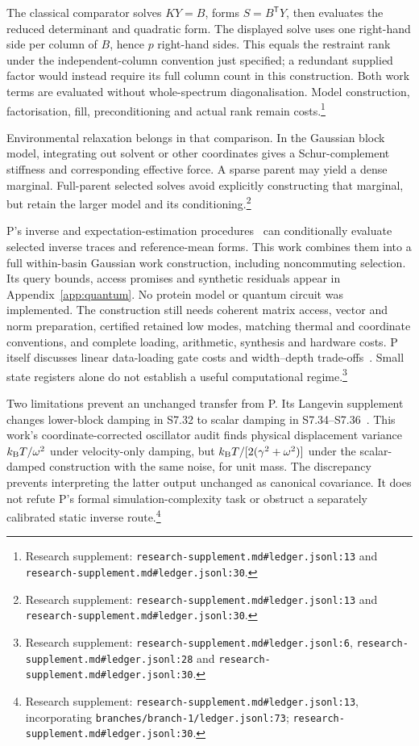 \documentclass{article}
\begin{document}
The classical comparator solves \(KY=B\), forms \(S=B^{\mathsf T}Y\), then evaluates the reduced determinant and quadratic form. The displayed solve uses one right-hand side per column of \(B\), hence \(p\) right-hand sides. This equals the restraint rank under the independent-column convention just specified; a redundant supplied factor would instead require its full column count in this construction. Both work terms are evaluated without whole-spectrum diagonalisation. Model construction, factorisation, fill, preconditioning and actual rank remain costs.\footnote{Research supplement: \nolinkurl{research-supplement.md\#ledger.jsonl:13} and \nolinkurl{research-supplement.md\#ledger.jsonl:30}.}

Environmental relaxation belongs in that comparison. In the Gaussian block model, integrating out solvent or other coordinates gives a Schur-complement stiffness and corresponding effective force. A sparse parent may yield a dense marginal. Full-parent selected solves avoid explicitly constructing that marginal, but retain the larger model and its conditioning.\footnote{Research supplement: \nolinkurl{research-supplement.md\#ledger.jsonl:13} and \nolinkurl{research-supplement.md\#ledger.jsonl:30}.}

P's inverse and expectation-estimation procedures~\cite{P} can conditionally evaluate selected inverse traces and reference-mean forms. This work combines them into a full within-basin Gaussian work construction, including noncommuting selection. Its query bounds, access promises and synthetic residuals appear in Appendix~\ref{app:quantum}. No protein model or quantum circuit was implemented. The construction still needs coherent matrix access, vector and norm preparation, certified retained low modes, matching thermal and coordinate conventions, and complete loading, arithmetic, synthesis and hardware costs. P itself discusses linear data-loading gate costs and width--depth trade-offs~\cite{P}. Small state registers alone do not establish a useful computational regime.\footnote{Research supplement: \nolinkurl{research-supplement.md\#ledger.jsonl:6}, \nolinkurl{research-supplement.md\#ledger.jsonl:28} and \nolinkurl{research-supplement.md\#ledger.jsonl:30}.}

Two limitations prevent an unchanged transfer from P. Its Langevin supplement changes lower-block damping in S7.32 to scalar damping in S7.34--S7.36~\cite{P}. This work's coordinate-corrected oscillator audit finds physical displacement variance \(k_{\rm B}T/\omega^2\) under velocity-only damping, but \(k_{\rm B}T/[2(\gamma^2+\omega^2)]\) under the scalar-damped construction with the same noise, for unit mass. The discrepancy prevents interpreting the latter output unchanged as canonical covariance. It does not refute P's formal simulation-complexity task or obstruct a separately calibrated static inverse route.\footnote{Research supplement: \nolinkurl{research-supplement.md\#ledger.jsonl:13}, incorporating \nolinkurl{branches/branch-1/ledger.jsonl:73}; \nolinkurl{research-supplement.md\#ledger.jsonl:30}.}
\end{document}
